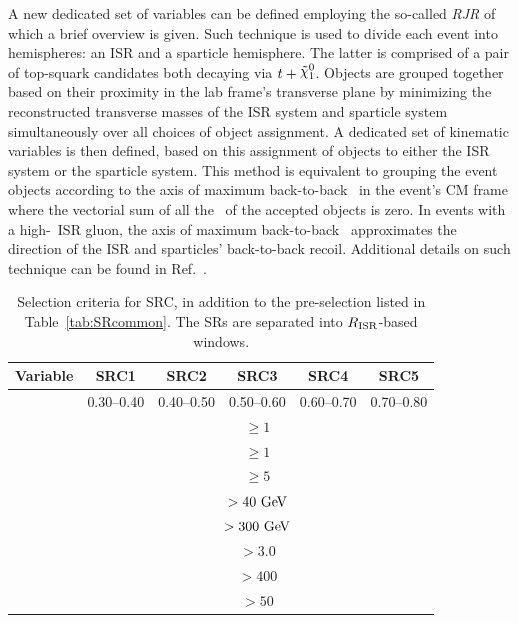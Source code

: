 				A new dedicated set of variables can be defined employing the so-called \emph{\ac{RJR}} of which a brief overview is given. Such technique is used to divide each event into hemispheres: an \ac{ISR} and a sparticle hemisphere. The latter is comprised of a pair of top-squark candidates both decaying via $t + \ninoone$. Objects are grouped together based on their proximity in the lab frame's transverse plane by minimizing the reconstructed transverse masses of the \ac{ISR} system and sparticle system simultaneously over all choices of object assignment. A dedicated set of kinematic variables is then defined, based on this assignment of objects to either the \ac{ISR} system or the sparticle system. This method is equivalent to grouping the event objects according to the axis of maximum back-to-back \pt\ in the event's \ac{CM} frame where the vectorial sum of all the \pt\ of the accepted objects is zero. In events with a high-\pT\ \ac{ISR} gluon, the axis of maximum back-to-back \pt\ approximates the direction of the \ac{ISR} and sparticles' back-to-back recoil. Additional details on such technique can be found in Ref.~\cite{RJR_ISR}.
				\begin{table}[htpb]
				  \caption{Selection criteria for SRC, in addition to the pre-selection listed in Table~\ref{tab:SRcommon}. The \acp{SR} are separated into $R_{\mathrm{ISR}}$-based windows.}
				  \begin{center}
				    \def\arraystretch{1.5}
				    \begin{tabular}{lccccc} \toprule
				      {\textbf{Variable}} & \textbf{SRC1} & \textbf{SRC2} & \textbf{SRC3} & \textbf{SRC4} & \textbf{SRC5} \\ \toprule
				      \rISR & 0.30--0.40 & 0.40--0.50 & 0.50--0.60 & 0.60--0.70 & 0.70--0.80\\ \midrule %
				      \nBJet & \multicolumn{5}{c}{$\ge1$} \\ %
				      \nBJetS & \multicolumn{5}{c}{$\ge1$} \\ %
				      \nJetS & \multicolumn{5}{c}{$\ge5$}  \\ %
				      \pTSBZero & \multicolumn{5}{c}{$>40\gev$}  \\ %
				      \mS & \multicolumn{5}{c}{$>300\gev$}  \\ %
				      \dPhiISRMET & \multicolumn{5}{c}{$>3.0$}  \\ %
				      \pTISR & \multicolumn{5}{c}{$>400$ \gev}   \\ %
				      \pTSFour & \multicolumn{5}{c}{$>50$ \gev}   \\ \bottomrule
				    \end{tabular}
				  \end{center}
				  \label{tab:SignalRegionC}
				\end{table}

